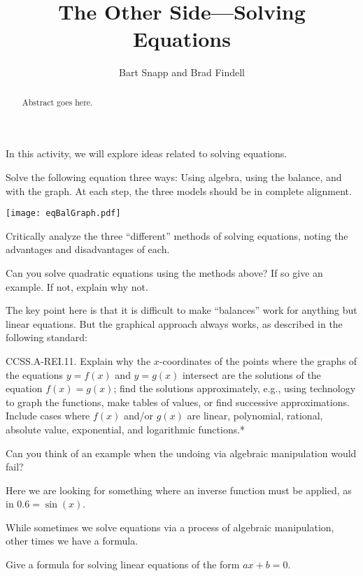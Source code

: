 \documentclass{ximera}
\title{The Other Side---Solving Equations}
\author{Bart Snapp and Brad Findell}
\begin{document}
\begin{abstract}
Abstract goes here.  
\end{abstract}
\maketitle

\label{A:otherSide}


In this activity, we will explore ideas related to solving equations.


\begin{problem}
Solve the following equation three ways: Using algebra, using the
balance, and with the graph. At each step, the three models should be in
complete alignment.
\begin{image}
\texttt{[image: eqBalGraph.pdf]}
\end{image}
\end{problem}


\begin{problem}
Critically analyze the three ``different'' methods of solving
equations, noting the advantages and disadvantages of each. 
\end{problem}

\begin{problem}
Can you solve quadratic equations using the methods above?
If so give an example. If not, explain why not.
\end{problem}

\begin{teachingnote}
The key point here is that it is difficult to make ``balances'' work for anything but linear equations.  But the graphical approach always works, as described in the following standard:  

CCSS.A-REI.11.  Explain why the $x$-coordinates of the points where the graphs of the equations $y = f(x)$ and $y = g(x)$ intersect are the solutions of the equation $f(x) = g(x)$; find the solutions approximately, e.g., using technology to graph the functions, make tables of values, or find successive approximations. Include cases where $f(x)$ and/or $g(x)$ are linear, polynomial, rational, absolute value, exponential, and logarithmic functions.*
\end{teachingnote}


\begin{problem}
Can you think of an example when the undoing via algebraic
manipulation would fail?
\end{problem}

\begin{teachingnote}
Here we are looking for something where an inverse function must be
applied, as in $0.6 = \sin(x)$.
\end{teachingnote}


While sometimes we solve equations via a process of algebraic
manipulation, other times we have a formula.


\begin{problem}
Give a formula for solving linear equations of the form $ax + b =0$.
\end{problem}
\end{document}
